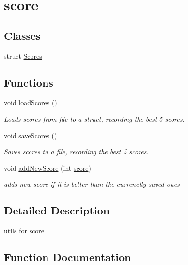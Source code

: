 \hypertarget{group__score}{}\section{score}
\label{group__score}
\subsection*{Classes}
\begin{DoxyCompactItemize}
\item 
struct \mbox{\hyperlink{struct_scores}{Scores}}
\end{DoxyCompactItemize}
\subsection*{Functions}
\begin{DoxyCompactItemize}
\item 
void \mbox{\hyperlink{group__score_ga1d81d36cfc183a1a1c8524facb3497aa}{load\+Scores}} ()
\begin{DoxyCompactList}\small\item\em Loads scores from file to a struct, recording the best 5 scores. \end{DoxyCompactList}\item 
void \mbox{\hyperlink{group__score_ga857943eead55a1059d11f95f7f1c936b}{save\+Scores}} ()
\begin{DoxyCompactList}\small\item\em Saves scores to a file, recording the best 5 scores. \end{DoxyCompactList}\item 
void \mbox{\hyperlink{group__score_ga9c2c75b1284995e5edb64e1381679730}{add\+New\+Score}} (int \mbox{\hyperlink{player_8c_a7aaf402558efbb864b266aff9bd517c1}{score}})
\begin{DoxyCompactList}\small\item\em adds new score if it is better than the currenctly saved ones \end{DoxyCompactList}\end{DoxyCompactItemize}


\subsection{Detailed Description}
utils for score 

\subsection{Function Documentation}
\mbox{\label{group__score_ga9c2c75b1284995e5edb64e1381679730}} 
